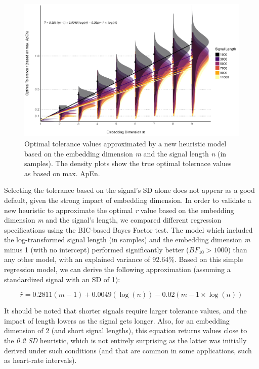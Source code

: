\documentclass[
  man,floatsintext]{apa6}
\begin{document}
\begin{figure}
\centering
\includegraphics{figures/fig2-1.pdf}
\caption{\label{fig:fig2}Optimal tolerance values approximated by a new heuristic model based on the embedding dimension \emph{m} and the signal length \emph{n} (in samples). The density plots show the true optimal tolernace values as based on max. ApEn.}
\end{figure}

Selecting the tolerance based on the signal's SD alone does not appear as a good default, given the strong impact of embedding dimension. In order to validate a new heuristic to approximate the optimal \emph{r} value based on the embedding dimension \emph{m} and the signal's length, we compared different regression specifications using the BIC-based Bayes Factor test. The model which included the log-transformed signal length (in samples) and the embedding dimension \emph{m} minus 1 (with no intercept) performed significantly better (\(BF_{10} > 1000\)) than any other model, with an explained variance of 92.64\%. Based on this simple regression model, we can derive the following approximation (assuming a standardized signal with an SD of 1):

\begin{equation}
\widehat{r} = 0.2811(m-1) + 0.0049(\log(n)) - 0.02(m-1 \times \log(n))
\end{equation}

It should be noted that shorter signals require larger tolerance values, and the impact of length lowers as the signal gets longer. Also, for an embedding dimension of 2 (and short signal lengths), this equation returns values close to the \emph{0.2 SD} heuristic, which is not entirely surprising as the latter was initially derived under such conditions (and that are common in some applications, such as heart-rate intervals).
\end{document}
